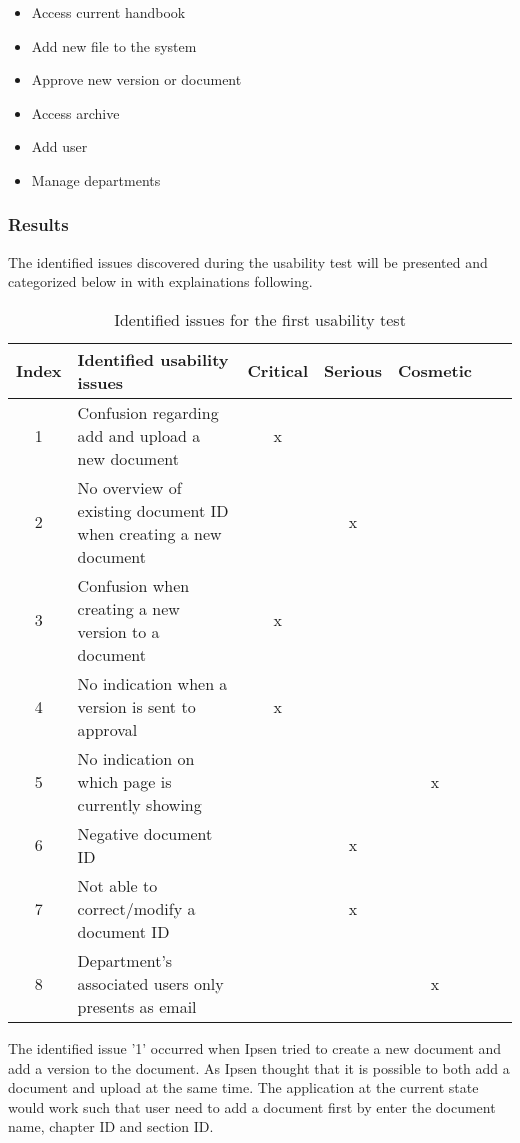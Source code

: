 \begin{itemize}
	\item Access current handbook 
	\item Add new file to the system
	\item Approve new version or document
	\item Access archive 
	\item Add user 
	\item Manage departments
\end{itemize}

\subsubsection*{Results}
The identified issues discovered during the usability test will be presented and categorized below in  with explainations following. 

\begin{table}[H]
	\begin{center}
	\begin{tabular}{| c | m{21em} | c | c | c | c | c |}
		\hline
		Index & \textbf{Identified usability issues} & Critical  & Serious & Cosmetic \\
		\hline
		 1 & Confusion regarding add and upload a new document   & x &  &  \\
		\hline
		 2 & No overview of existing document ID when creating a new document &  & x & \\
		\hline
		 3 & Confusion when creating a new version to a document & x & &  \\
		\hline
		4 & No indication when a version is sent to approval & x & & \\
		\hline
		5 & No indication on which page is currently showing &  &  & x \\
		\hline
		6 & Negative document ID &  & x & \\
		\hline
		7 & Not able to correct/modify a document ID & & x &  \\
		\hline
		8 & Department's associated users only presents as email &  &  & x \\
		\hline
	\end{tabular}
	\end{center}
	\caption{Identified issues for the first usability test}\label{tab:utest1}
\end{table}

The identified issue '1' occurred when Ipsen tried to create a new document and add a version to the document. 
As Ipsen thought that it is possible to both add a document and upload at the same time. 
The application at the current state would work such that user need to add a document first by enter the document name, chapter ID and section ID. 

